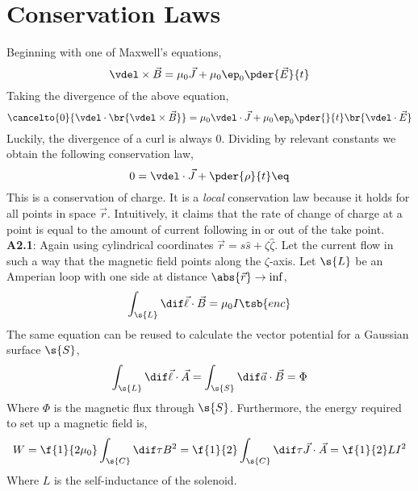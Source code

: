 \documentclass{article}
\begin{document}
\section{Conservation Laws}
Beginning with one of Maxwell's equations,
\[ \vdel \times \vec{B} = \mu_0 \vec{J} + \mu_0 \ep_0 \pder{\vec{E}}{t} \]
Taking the divergence of the above equation,
\[ \cancelto{0}{\vdel \cdot \br{\vdel \times \vec{B}}} = \mu_0 \vdel \cdot \vec{J} + \mu_0 \ep_0 \pder{}{t}\br{\vdel \cdot \vec{E}} \]
Luckily, the divergence of a curl is always $0$. Dividing by relevant constants we obtain the following conservation law,
\[ 0 = \vdel \cdot \vec{J} + \pder{\rho}{t} \eq \label{eq:conservation_charge}\]
This is a conservation of charge. It is a \textit{local} conservation law because it holds for all points in space $\vec{r}$. Intuitively, it claims that the rate of change of charge at a point is equal to the amount of current following in or out of the take point. \\

\textbf{A2.1}: Again using cylindrical coordinates $\vec{r} = s \hat{s} + \zeta \hat{\zeta}$. Let the current flow in such a way that the magnetic field points along the $\zeta$-axis. Let $\s{L}$ be an Amperian loop with one side at distance $\abs{\vec{r}} \to \inf$,
\[ \int_{\s{L}} \dif \vec{\ell} \cdot \vec{B} = \mu_0 I\tsb{enc} \]
The same equation can be reused to calculate the vector potential for a Gaussian surface $\s{S}$,
\[ \int_{\s{L}} \dif \vec{\ell} \cdot \vec{A} = \int_{\s{S}} \dif \vec{a} \cdot \vec{B} = \Phi \]
Where $\Phi$ is the magnetic flux through $\s{S}$. Furthermore, the energy required to set up a magnetic field is,
\[ W = \f{1}{2 \mu_0} \int_{\s{C}} \dif \tau B^2 = \f{1}{2} \int_{\s{C}} \dif \tau \vec{J} \cdot \vec{A} = \f{1}{2} L I^2 \]
Where $L$ is the self-inductance of the solenoid.
\end{document}
